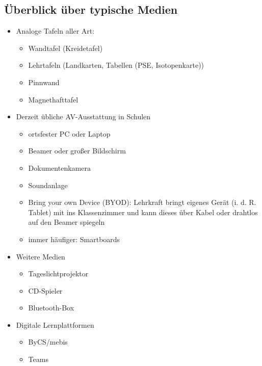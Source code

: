 \subsection{\"{U}berblick \"{u}ber typische Medien}
\begin{itemize}
\item Analoge Tafeln aller Art:
	\begin{itemize}
	\item Wandtafel (Kreidetafel)
	\item Lehrtafeln (Landkarten, Tabellen (PSE, Isotopen\-karte))
	\item Pinnwand
	\item Magnet\-haft\-ta\-fel
	\end{itemize}

\item Derzeit übliche AV-Ausstattung in Schulen
	\begin{itemize}
		\item ortsfester PC oder Laptop
		\item Beamer oder großer Bildschirm
		\item Dokumentenkamera
		\item Soundanlage
		\item Bring your own Device (BYOD): Lehrkraft bringt eigenes Gerät (i. d. R. Tablet) mit ins Klassenzimmer und kann dieses über Kabel oder drahtlos auf den Beamer spiegeln
		\item immer häufiger: Smartboards
	\end{itemize}

\item Weitere Medien
	\begin{itemize}
		\item Tageslichtprojektor
		\item CD-Spieler
		\item Bluetooth-Box
	\end{itemize}
\item Digitale Lernplattformen
	\begin{itemize}
		\item ByCS/mebis
		\item Teams
	\end{itemize}

\end{itemize}

